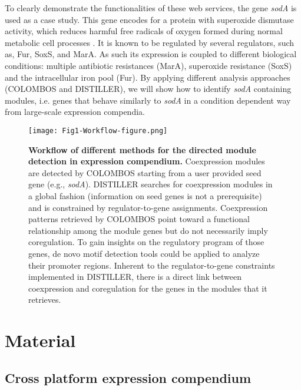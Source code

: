 To clearly demonstrate the functionalities of these web services, 
the gene \textit{sodA} is used as a case study. This gene encodes for a protein 
with superoxide dismutase activity, which reduces harmful free radicals of 
oxygen formed during normal metabolic cell processes \cite{Fawcett1995, 
Tardat1993, Jair1995}. 
It is known to be regulated by several regulators, such as, 
Fur, SoxS, and MarA. As such its expression is coupled to different biological 
conditions: multiple antibiotic resistances (MarA), superoxide resistance 
(SoxS) and the intracellular iron pool (Fur). By applying different analysis 
approaches (COLOMBOS and DISTILLER), we will show how to identify \textit{sodA} 
containing modules, i.e. genes that behave similarly to \textit{sodA} in a 
condition dependent way from large-scale expression compendia.

\begin{figure}[tb]
	\centering
  	\texttt{[image: Fig1-Workflow-figure.png]}
	\caption[Workflow of directed module detection in expression 
	compendium]{
	\textbf{Workflow of different methods for the directed module detection in 
	expression compendium.} 
	Coexpression modules are detected by COLOMBOS starting from a user provided 
	seed gene (e.g., \textit{sodA}). 
	DISTILLER searches for coexpression modules in a global fashion 
	(information on seed genes is not a prerequisite) and is constrained by 
	regulator-to-gene assignments. 
	Coexpression patterns retrieved by COLOMBOS point toward a functional 
	relationship among the module genes but do not necessarily imply 
	coregulation. To gain insights on the regulatory program of those genes, de 
	novo motif detection tools could be applied to analyze their promoter 
	regions. Inherent to the regulator-to-gene constraints implemented in 
	DISTILLER, there is a direct link between coexpression and coregulation for 
	the genes in the modules that it retrieves.}
	\label{fig:workflow-distiller-colombos}
\end{figure}

\section{Material}


\subsection{Cross platform expression compendium}\label{sec:dist-comp} 

